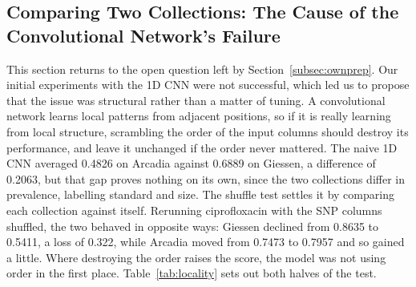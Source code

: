 \FloatBarrier
\subsection{Comparing Two Collections: The Cause of the Convolutional Network's Failure}
\label{subsec:cnnfail}

This section returns to the open question left by Section~\ref{subsec:ownprep}. Our initial
experiments with the 1D CNN were not successful, which led us to propose that the issue was
structural rather than a matter of tuning. A convolutional network learns local patterns from
adjacent positions, so if it is really learning from local structure, scrambling the order of the
input columns should destroy its performance, and leave it unchanged if the order never mattered.
The naive 1D CNN averaged 0.4826 on Arcadia against 0.6889 on Giessen, a difference of 0.2063,
but that gap proves nothing on its own, since the two collections differ in prevalence, labelling
standard and size. The shuffle test settles it by comparing each collection against itself.
Rerunning ciprofloxacin with the SNP columns shuffled, the two behaved in opposite ways: Giessen
declined from 0.8635 to 0.5411, a loss of 0.322, while Arcadia moved from 0.7473 to 0.7957 and so
gained a little. Where destroying the order raises the score, the model was not using order in the
first place. Table~\ref{tab:locality} sets out both halves of the test.

